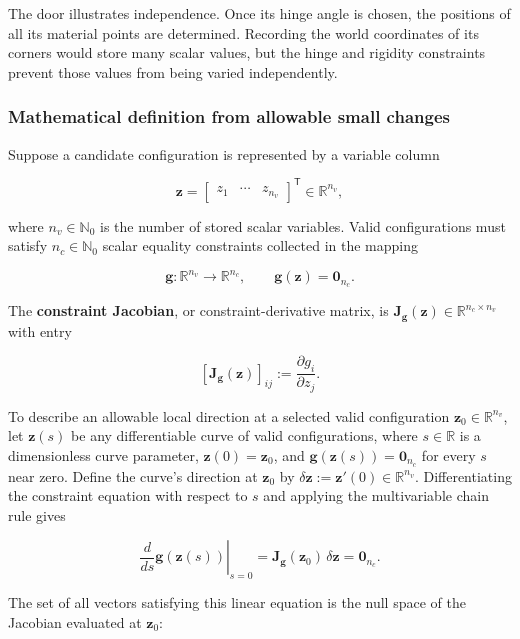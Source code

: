 \documentclass[
  australian,
  12pt,
  letterpaper,
  DIV=11,
  numbers=noendperiod,
  twoside]{scrreprt}
\begin{document}
The door illustrates independence. Once its hinge angle is chosen, the
positions of all its material points are determined. Recording the world
coordinates of its corners would store many scalar values, but the hinge
and rigidity constraints prevent those values from being varied
independently.

\subsubsection{Mathematical definition from allowable small
changes}\label{mathematical-definition-from-allowable-small-changes}

Suppose a candidate configuration is represented by a variable column

\[
\mathbf z
=
\begin{bmatrix}
z_1&\cdots&z_{n_v}
\end{bmatrix}^{\mathsf T}
\in\mathbb R^{n_v},
\]

where \(n_v\in\mathbb N_0\) is the number of stored scalar variables.
Valid configurations must satisfy \(n_c\in\mathbb N_0\) scalar equality
constraints collected in the mapping

\[
\mathbf g:\mathbb R^{n_v}\rightarrow\mathbb R^{n_c},
\qquad
\mathbf g(\mathbf z)=\mathbf 0_{n_c}.
\]

The \textbf{constraint Jacobian}, or constraint-derivative matrix, is
\(\mathbf J_{\mathbf g}(\mathbf z)\in\mathbb R^{n_c\times n_v}\) with
entry

\[
\left[\mathbf J_{\mathbf g}(\mathbf z)\right]_{ij}
\mathrel{:=}
\frac{\partial g_i}{\partial z_j}.
\]

To describe an allowable local direction at a selected valid
configuration \(\mathbf z_0\in\mathbb R^{n_v}\), let \(\mathbf z(s)\) be
any differentiable curve of valid configurations, where
\(s\in\mathbb R\) is a dimensionless curve parameter,
\(\mathbf z(0)=\mathbf z_0\), and
\(\mathbf g(\mathbf z(s))=\mathbf 0_{n_c}\) for every \(s\) near zero.
Define the curve's direction at \(\mathbf z_0\) by
\(\delta\mathbf z\mathrel{:=}\mathbf z'(0)\in\mathbb R^{n_v}\).
Differentiating the constraint equation with respect to \(s\) and
applying the multivariable chain rule gives

\[
\boxed{
\left.
\frac{d}{ds}\mathbf g(\mathbf z(s))
\right|_{s=0}
=
\mathbf J_{\mathbf g}(\mathbf z_0)\,\delta\mathbf z
=
\mathbf 0_{n_c}
}.
\]

The set of all vectors satisfying this linear equation is the null space
of the Jacobian evaluated at \(\mathbf z_0\):
\end{document}
